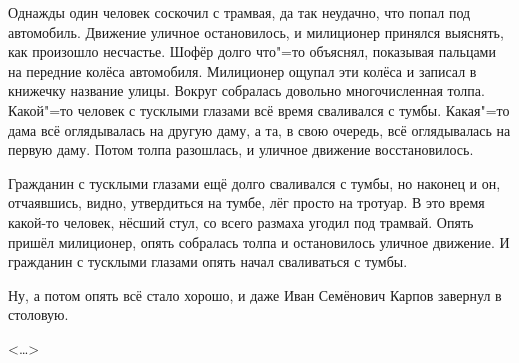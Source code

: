 Однажды один человек соскочил с трамвая, да так неудачно, что попал под автомобиль. Движение уличное остановилось, и милиционер принялся выяснять, как произошло несчастье. Шофёр долго что"=то объяснял, показывая пальцами на передние колёса автомобиля. Милиционер ощупал эти колёса и записал в книжечку название улицы. Вокруг собралась довольно многочисленная толпа. Какой"=то человек с тусклыми глазами всё время сваливался с тумбы. Какая"=то дама всё оглядывалась на другую даму, а та, в свою очередь, всё оглядывалась на первую даму. Потом толпа разошлась, и уличное движение восстановилось.

Гражданин с тусклыми глазами ещё долго сваливался с тумбы, но наконец и он, отчаявшись, видно, утвердиться на тумбе, лёг просто на тротуар. В это время какой-то человек, нёсший стул, со всего размаха угодил под трамвай. Опять пришёл милиционер, опять собралась толпа и остановилось уличное движение. И гражданин с тусклыми глазами опять начал сваливаться с тумбы.

Ну, а потом опять всё стало хорошо, и даже Иван Семёнович Карпов завернул в столовую.

\begin{flushright}
<\dots{}>
\end{flushright}